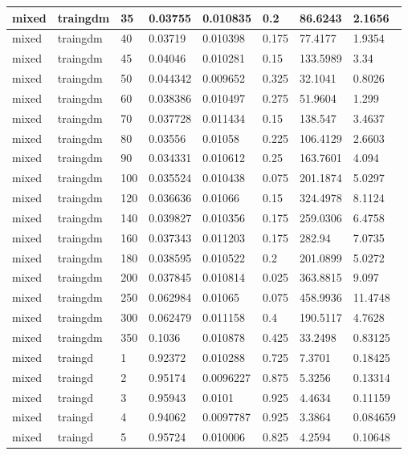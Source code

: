 \begin{longtable}{llllllll}
mixed & traingdm & 35 & 0.03755 & 0.010835 & 0.2 & 86.6243 & 2.1656 \\ \hline 
mixed & traingdm & 40 & 0.03719 & 0.010398 & 0.175 & 77.4177 & 1.9354 \\ \hline 
mixed & traingdm & 45 & 0.04046 & 0.010281 & 0.15 & 133.5989 & 3.34 \\ \hline 
mixed & traingdm & 50 & 0.044342 & 0.009652 & 0.325 & 32.1041 & 0.8026 \\ \hline 
mixed & traingdm & 60 & 0.038386 & 0.010497 & 0.275 & 51.9604 & 1.299 \\ \hline 
mixed & traingdm & 70 & 0.037728 & 0.011434 & 0.15 & 138.547 & 3.4637 \\ \hline 
mixed & traingdm & 80 & 0.03556 & 0.01058 & 0.225 & 106.4129 & 2.6603 \\ \hline 
mixed & traingdm & 90 & 0.034331 & 0.010612 & 0.25 & 163.7601 & 4.094 \\ \hline 
mixed & traingdm & 100 & 0.035524 & 0.010438 & 0.075 & 201.1874 & 5.0297 \\ \hline 
mixed & traingdm & 120 & 0.036636 & 0.01066 & 0.15 & 324.4978 & 8.1124 \\ \hline 
mixed & traingdm & 140 & 0.039827 & 0.010356 & 0.175 & 259.0306 & 6.4758 \\ \hline 
mixed & traingdm & 160 & 0.037343 & 0.011203 & 0.175 & 282.94 & 7.0735 \\ \hline 
mixed & traingdm & 180 & 0.038595 & 0.010522 & 0.2 & 201.0899 & 5.0272 \\ \hline 
mixed & traingdm & 200 & 0.037845 & 0.010814 & 0.025 & 363.8815 & 9.097 \\ \hline 
mixed & traingdm & 250 & 0.062984 & 0.01065 & 0.075 & 458.9936 & 11.4748 \\ \hline 
mixed & traingdm & 300 & 0.062479 & 0.011158 & 0.4 & 190.5117 & 4.7628 \\ \hline 
mixed & traingdm & 350 & 0.1036 & 0.010878 & 0.425 & 33.2498 & 0.83125 \\ \hline 
mixed & traingd & 1 & 0.92372 & 0.010288 & 0.725 & 7.3701 & 0.18425 \\ \hline 
mixed & traingd & 2 & 0.95174 & 0.0096227 & 0.875 & 5.3256 & 0.13314 \\ \hline 
mixed & traingd & 3 & 0.95943 & 0.0101 & 0.925 & 4.4634 & 0.11159 \\ \hline 
mixed & traingd & 4 & 0.94062 & 0.0097787 & 0.925 & 3.3864 & 0.084659 \\ \hline 
mixed & traingd & 5 & 0.95724 & 0.010006 & 0.825 & 4.2594 & 0.10648 \\ \hline 

\end{longtable}
